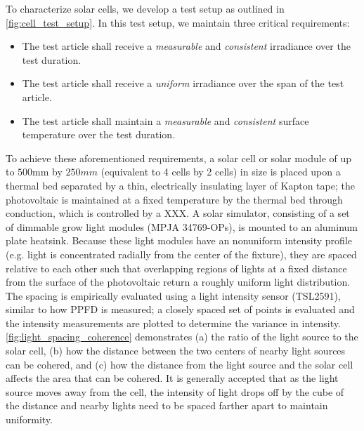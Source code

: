 
To characterize solar cells, we develop a test setup as outlined in
\autoref{fig:cell_test_setup}. In this test setup, we maintain three critical
requirements:

\begin{itemize}
    \item The test article shall receive a \textit{measurable} and
    \textit{consistent} irradiance over the test duration.
    \item The test article shall receive a \textit{uniform} irradiance over the
    span of the test article.
    \item The test article shall maintain a \textit{measurable} and
    \textit{consistent} surface temperature over the test duration.
\end{itemize}

To achieve these aforementioned requirements, a solar cell or solar module of up
to $500 \si{\mm}$ by $250 \si{mm}$ (equivalent to 4 cells by 2 cells) in size is
placed upon a thermal bed separated by a thin, electrically insulating layer of
Kapton tape; the photovoltaic is maintained at a fixed temperature by the
thermal bed through conduction, which is controlled by a  XXX. A solar simulator, consisting of a set of dimmable
grow light modules (MPJA 34769-OPs), is mounted to an aluminum plate heatsink.
Because these light modules have an nonuniform intensity profile (e.g. light is
concentrated radially from the center of the fixture), they are spaced relative
to each other such that overlapping regions of lights at a fixed distance from
the surface of the photovoltaic return a roughly uniform light distribution. The
spacing is empirically evaluated using a light intensity sensor (TSL2591),
similar to how \acf{PPFD} is measured\cite{ppfd_measurement}; a closely spaced
set of points is evaluated and the intensity measurements are plotted to
determine the variance in intensity. \autoref{fig:light_spacing_coherence}
demonstrates (a) the ratio of the light source to the solar cell, (b) how the
distance between the two centers of nearby light sources can be cohered, and (c)
how the distance from the light source and the solar cell affects the area that
can be cohered. It is generally accepted that as the light source moves away
from the cell, the intensity of light drops off by the cube of the distance and
nearby lights need to be spaced farther apart to maintain uniformity.


